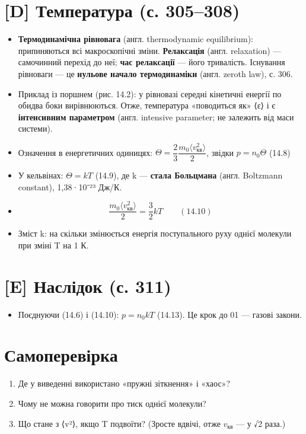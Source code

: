 \documentclass[11pt,a4paper,oneside]{book}
\begin{document}
\section*{[D] Температура (с. 305–308)}
\begin{itemize}
\item \textbf{Термодинамічна рівновага} (англ. thermodynamic equilibrium): припиняються всі макроскопічні зміни. \textbf{Релаксація} (англ. relaxation) — самочинний перехід до неї; \textbf{час релаксації} — його тривалість. Існування рівноваги — це \textbf{нульове начало термодинаміки} (англ. zeroth law), с. 306.
\item Приклад із поршнем (рис. 14.2): у рівновазі середні кінетичні енергії по обидва боки вирівнюються. Отже, температура «поводиться як» ⟨ε⟩ і є \textbf{інтенсивним параметром} (англ. intensive parameter; не залежить від маси системи).
\item Означення в енергетичних одиницях: $\Theta = \dfrac23\dfrac{m_0\langle v_{\text{кв}}^2\rangle}{2}$, звідки $p = n_0\Theta$ (14.8)
\item У кельвінах: $\Theta = kT$ (14.9), де k — \textbf{стала Больцмана} (англ. Boltzmann constant), 1,38·10⁻²³ Дж/К.
\item \[\frac{m_0\langle v_{\text{кв}}^2\rangle}{2} = \frac32kT\qquad(14.10)\]
\item Зміст k: на скільки змінюється енергія поступального руху однієї молекули при зміні T на 1 К.
\end{itemize}

\section*{[E] Наслідок (с. 311)}
\begin{itemize}
\item Поєднуючи (14.6) і (14.10): $p = n_0kT$ (14.13). Це крок до 01 — газові закони.
\end{itemize}

\section*{Самоперевірка}
\begin{enumerate}
\item Де у виведенні використано «пружні зіткнення» і «хаос»?
\item Чому не можна говорити про тиск однієї молекули?
\item Що стане з ⟨v²⟩, якщо T подвоїти? (Зросте вдвічі, отже $v_{\text{кв}}$ — у √2 раза.)
\end{enumerate}
\end{document}
